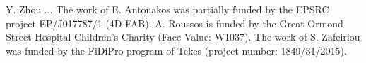\noindent Y. Zhou ... 
The work of E. Antonakos was partially funded by the EPSRC project EP/J017787/1 (4D-FAB). 
A. Roussos is funded by the Great Ormond Street Hospital Children's Charity (Face Value: W1037).
The work of S. Zafeiriou was funded by the FiDiPro program of Tekes (project number: 1849/31/2015). 

